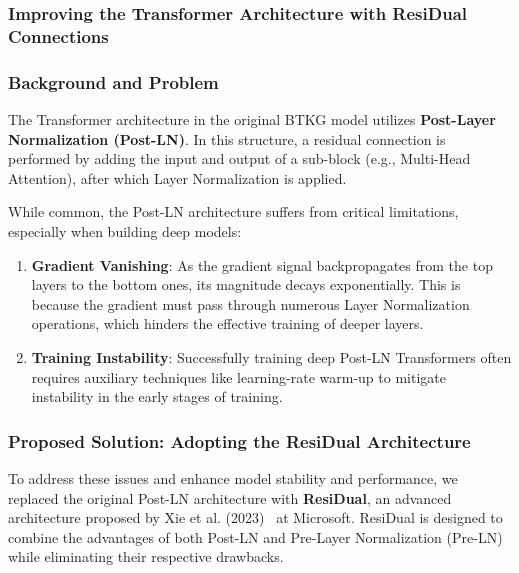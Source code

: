\subsubsection{Improving the Transformer Architecture with ResiDual Connections}

\subsubsection*{Background and Problem}

The Transformer architecture in the original BTKG model utilizes \textbf{Post-Layer Normalization (Post-LN)}. In this structure, a residual connection is performed by adding the input and output of a sub-block (e.g., Multi-Head Attention), after which Layer Normalization is applied.

While common, the Post-LN architecture suffers from critical limitations, especially when building deep models:

\begin{enumerate}[nosep]
    \item \textbf{Gradient Vanishing}: As the gradient signal backpropagates from the top layers to the bottom ones, its magnitude decays exponentially. This is because the gradient must pass through numerous Layer Normalization operations, which hinders the effective training of deeper layers.
    
    \item \textbf{Training Instability}: Successfully training deep Post-LN Transformers often requires auxiliary techniques like learning-rate warm-up to mitigate instability in the early stages of training.
\end{enumerate}

\subsubsection*{Proposed Solution: Adopting the ResiDual Architecture}

To address these issues and enhance model stability and performance, we replaced the original Post-LN architecture with \textbf{ResiDual}, an advanced architecture proposed by Xie et al. (2023)~\cite{ResiDual} at Microsoft. ResiDual is designed to combine the advantages of both Post-LN and Pre-Layer Normalization (Pre-LN) while eliminating their respective drawbacks.

